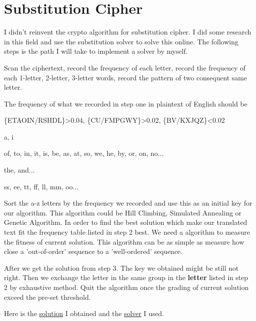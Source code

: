 \documentclass{article}
\begin{document}
    \maketitle
    \section{Substitution Cipher}
    I didn't reinvent the crypto algorithm for substitution cipher. I did some research in this field and use the substitution solver to solve this online. The following steps is the path I will take to implement a solver by myself.
    \begin{tlist}{3}
      \item[1.]
      Scan the ciphertext, record the frequency of each letter, record the frequency of each 1-letter, 2-letter, 3-letter words, record the pattern of two consequent same letter.
      \item[2.]
      The frequency of what we recorded in step one in plaintext of English should be
      \begin{tlist}{0}
        \item[letter:]\{ETAOIN/RSHDL\}>0.04, \{CU/FMPGWY\}>0.02, \{BV/KXJQZ\}<0.02
        \item[1-letter word:]a, i
        \item[2-letter word:]of, to, in, it, is, be, as, at, so, we, he, by, or, on, no...
        \item[3-letter word:]the, and...
        \item[consequent pattern:]ss, ee, tt, ff, ll, mm, oo...
      \end{tlist}
      \item[3.]
      Sort the a-z letters by the frequency we recorded and use this as an initial key for our algorithm. This algorithm could be Hill Climbing, Simulated Annealing or Genetic Algorithm. In order to find the best solution which make our translated text fit the frequency table listed in step 2 best. We need a algorithm to measure the fitness of current solution. This algorithm can be as simple as measure how close a 'out-of-order' sequence to a 'well-ordered' sequence.
      \item[4.]
      After we get the solution from step 3. The key we obtained might be still not right. Then we exchange the letter in the same group in the \textbf{letter} listed in step 2 by exhaustive method. Quit the algorithm once the grading of current solution exceed the pre-set threshold.
    \end{tlist}
    Here is the \href{http://freetexthost.com/j54kutb05a}{solution} I obtained and the \href{https://www.guballa.de/substitution-solver}{solver} I used.
    
\end{document}
